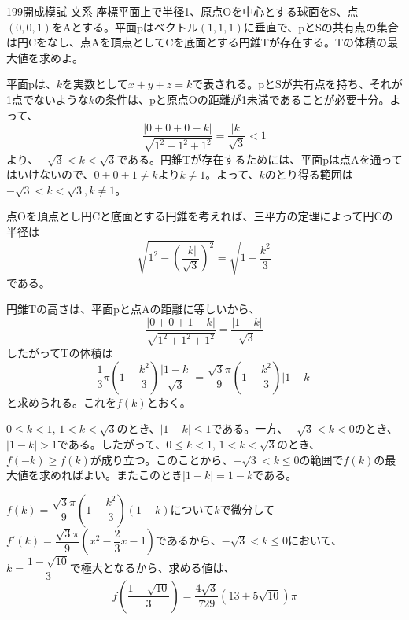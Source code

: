 \begin{prob}{199}{}{開成模試 文系}
 座標平面上で半径1、原点Oを中心とする球面をS、点$(0,0,1)$をAとする。平面pはベクトル$(1,1,1)$に垂直で、pとSの共有点の集合は円Cをなし、点Aを頂点としてCを底面とする円錐Tが存在する。Tの体積の最大値を求めよ。
\end{prob}
平面pは、$k$を実数として$x+y+z=k$で表される。pとSが共有点を持ち、それが1点でないような$k$の条件は、pと原点Oの距離が1未満であることが必要十分。よって、
\[ \frac{|0+0+0-k|}{\sqrt{1^2+1^2+1^2}}=\frac{|k|}{\sqrt{3}} < 1 \]
より、$-\sqrt{3}<k<\sqrt{3}$である。円錐Tが存在するためには、平面pは点Aを通ってはいけないので、$0+0+1\neq k$より$k\neq 1$。よって、$k$のとり得る範囲は$-\sqrt{3}<k<\sqrt{3}, k\neq 1$。

点Oを頂点とし円Cと底面とする円錐を考えれば、三平方の定理によって円Cの半径は
\[ \sqrt{1^2-\left(\frac{|k|}{\sqrt{3}}\right)^2} = \sqrt{1-\frac{k^2}{3}} \]
である。

円錐Tの高さは、平面pと点Aの距離に等しいから、
\[ \frac{|0+0+1-k|}{\sqrt{1^2+1^2+1^2}}=\frac{|1-k|}{\sqrt{3}} \]
したがってTの体積は
\[ \frac{1}{3}\pi \left(1-\frac{k^2}{3}\right) \frac{|1-k|}{\sqrt{3}} = \frac{\sqrt{3}\pi}{9}\left(1-\frac{k^2}{3}\right)|1-k| \]
と求められる。これを$f(k)$とおく。

$0\le k < 1$, $1<k<\sqrt{3}$のとき、$|1-k|\le 1$である。一方、$-\sqrt{3}<k<0$のとき、$|1-k|>1$である。したがって、$0\le k<1$, $1<k<\sqrt{3}$のとき、$f(-k)\ge f(k)$が成り立つ。このことから、$-\sqrt{3}<k\le 0$の範囲で$f(k)$の最大値を求めればよい。またこのとき$|1-k|=1-k$である。

$f(k)=\dfrac{\sqrt{3}\pi}{9}\left(1-\dfrac{k^2}{3}\right)(1-k)$について$k$で微分して$f'(k)=\dfrac{\sqrt{3}\pi}{9}\left(x^2-\dfrac{2}{3}x-1\right)$であるから、$-\sqrt{3}<k\le 0$において、$k=\dfrac
{1-\sqrt{10}}{3}$で極大となるから、求める値は、
\[ f\left(\frac{1-\sqrt{10}}{3}\right) = \frac{4\sqrt{3}}{729}(13+5\sqrt{10})\pi \]
